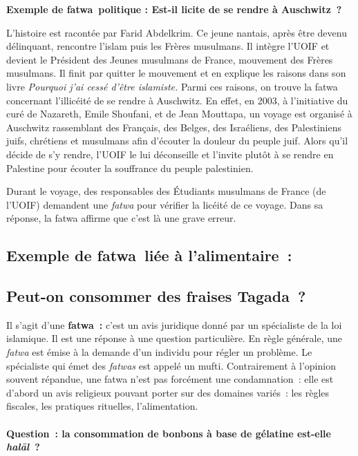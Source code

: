 \textbf{Exemple de fatwa~politique : Est-il licite de se rendre à
Auschwitz~?}

L'histoire est racontée par Farid Abdelkrim. Ce jeune nantais, après
être devenu délinquant, rencontre l'islam puis les Frères musulmans. Il
intègre l'UOIF et devient le Président des Jeunes musulmans de France,
mouvement des Frères musulmans. Il finit par quitter le mouvement et en
explique les raisons dans son livre \emph{Pourquoi j'ai cessé d'être
islamiste.} Parmi ces raisons, on trouve la fatwa concernant l'illicéité
de se rendre à Auschwitz. En effet, en 2003, à l'initiative du curé de
Nazareth, Emile Shoufani, et de Jean Mouttapa, un voyage est organisé à
Auschwitz rassemblant des Français, des Belges, des Israéliens, des
Palestiniens juifs, chrétiens et musulmans afin d'écouter la douleur du
peuple juif. Alors qu'il décide de s'y rendre, l'UOIF le lui déconseille
et l'invite plutôt à se rendre en Palestine pour écouter la souffrance
du peuple palestinien.

Durant le voyage, des responsables des Étudiants musulmans de France (de
l'UOIF) demandent une \emph{fatwa} pour vérifier la licéité de ce
voyage. Dans sa réponse, la fatwa affirme que c'est là une grave erreur.

\subsection{Exemple de fatwa~liée à l'alimentaire~:}

\subsection{Peut-on consommer des fraises Tagada~?}

Il s'agit d'une \textbf{fatwa~:} c'est un avis juridique donné par un
spécialiste de la loi islamique. Il est une réponse à une question
particulière. En règle générale, une \emph{fatwa} est émise à la demande
d'un individu pour régler un problème. Le spécialiste qui émet des
\emph{fatwas} est appelé un mufti. Contrairement à l'opinion souvent
répandue, une fatwa n'est pas forcément une condamnation~: elle est
d'abord un avis religieux pouvant porter sur des domaines variés~: les
règles fiscales, les pratiques rituelles, l'alimentation.

\paragraph{Question~: la consommation de bonbons à base de gélatine est-elle
\emph{halāl}~?}

